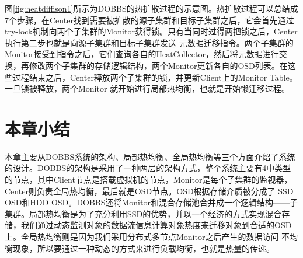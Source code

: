 图\ref{fig:heatdiffison1}所示为DOBBS的热扩散过程的示意图。热扩散过程可以总结成7个步骤，在Center找到需要被扩散的源子集群和目标子集群之后，它会首先通过try-lock机制向两个子集群的Monitor获得锁。只有当同时过得两把锁之后，Center执行第二步也就是向源子集群和目标子集群发送
元数据迁移指令。两个子集群的Monitor接受到指令之后，它们查询各自的HeatCollector，然后将元数据进行交换，再修改两个子集群的存储逻辑结构，两个Monitor更新各自的OSD列表。在这些过程结束之后，Center释放两个子集群的锁，并更新Client上的Monitor Table。一旦锁被释放，两个Monitor
就开始进行局部热均衡，也就是开始懒迁移过程。

\section{本章小结}
本章主要从DOBBS系统的架构、局部热均衡、全局热均衡等三个方面介绍了系统的设计。DOBBS的架构是采用了一种两层的架构方式，整个系统主要有4中类型的节点，其中Client节点是搭载虚拟机的节点，Monitor是每个子集群的监视器，Center则负责全局热均衡，最后就是OSD节点。OSD根据存储介质被分成了
SSD OSD和HDD OSD。DOBBS还将Monitor和混合存储池合并成一个逻辑结构——子集群。局部热均衡是为了充分利用SSD的优势，并以一个经济的方式实现混合存储，我们通过动态监测对象的数据流信息计算对象热度来迁移对象到合适的OSD上。全局热均衡则是因为我们采用分布式多节点Monitor之后产生的数据访问
不均衡现象，所以要通过一种动态的方式来进行负载均衡，也就是热量的传递。

